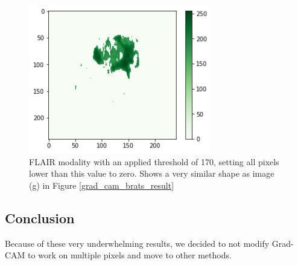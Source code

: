 \begin{figure}[H]
\centering
\includegraphics[width=8cm]{chapters/04_segmentation/images/flair_treshold.png}
\caption{FLAIR modality with an applied threshold of 170, setting all pixels lower than this value to zero. Shows a very similar shape as image (g) in Figure \ref{grad_cam_brats_result}}
\label{grad_cam_treshold}
\end{figure}


\subsection{Conclusion}
Because of these very underwhelming results, we decided to not modify Grad-CAM to work on multiple pixels and move to other methods.
